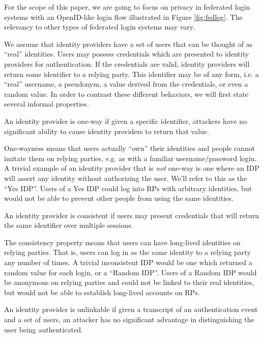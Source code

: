 \documentclass{llncs}
\begin{document}
For the scope of this paper, we are going to focus on privacy in
federated login systems with an OpenID-like login flow illustrated in
Figure \ref{fig:fedlog}. The relevancy to other types of federated
login systems may vary. 

We assume that identity providers have a set of users that can be
thought of as ``real'' identities. Users may possess credentials which
are presented to identity providers for authentication. If the credentials
are valid, identity providers will return some identifier to a relying
party. This identifier may be of any form, i.e. a ``real'' username, a
pseudonym, a value derived from the credentials, or even a random
value. In order to contrast these different behaviors, we will first
state several informal properties.

\begin{definition}
\label{def:ownership}
An identity provider is one-way if given a specific identifier,
attackers have no significant ability to cause identity providers to
return that value.
\end{definition}

One-wayness means that users actually ``own'' their identities and
people cannot imitate them on relying parties, e.g. as with a familiar
username/password login. A trivial example of an identity provider
that is \textit{not} one-way is one where an IDP will assert any
identity without authorizing the user.  We'll refer to this as the
``Yes IDP''. Users of a Yes IDP could log into RPs with arbitrary
identities, but would not be able to prevent other people from using
the same identities.

\begin{definition}[Consistency]
\label{def:consistency}
An identity provider is consistent if users may present credentials
that will return the same identifier over multiple sessions.
\end{definition}

The consistency property means that users can have long-lived
identities on relying parties. That is, users can log in as the same
identity to a relying party any number of times. A trivial
inconsistent IDP would be one which returned a random value for each
login, or a ``Random IDP''. Users of a Random IDP would be anonymous
on relying parties and could not be linked to their real identities,
but would not be able to establish long-lived accounts on RPs.

\begin{definition}[Unlinkability]
\label{def:unlinkability}
An identity provider is unlinkable if given a transcript of an
authentication event and a set of users, an attacker has no
significant advantage in distinguishing the user being authenticated.
\end{definition}
\end{document}
